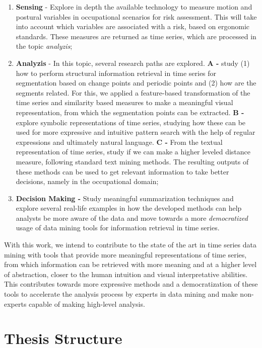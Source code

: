 \begin{enumerate}
\item \textbf{Sensing} - Explore in depth the available technology to measure motion and postural variables in occupational scenarios for risk assessment. This will take into account which variables are associated with a risk, based on ergonomic standards. These measures are returned as time series, which are processed in the topic \textit{analyzis};

\item \textbf{Analyzis} - In this topic, several research paths are explored. \textbf{A -} study (1) how to perform structural information retrieval in time series for segmentation based on change points and periodic points and (2) how are the segments related. For this, we applied a feature-based transformation of the time series and similarity based measures to make a meaningful visual representation, from which the segmentation points can be extracted. \textbf{B -} explore symbolic representations of time series, studying how these can be used for more expressive and intuitive pattern search with the help of regular expressions and ultimately natural language. \textbf{C -} From the textual representation of time series, study if we can make a higher leveled distance measure, following standard text mining methods. The resulting outputs of these methods can be used to get relevant information to take better decisions, namely in the occupational domain;

\item \textbf{Decision Making -} Study meaningful summarization techniques and explore several real-life examples in how the developed methods can help analysts be more aware of the data and move towards a more \textit{democratized} usage of data mining tools for information retrieval in time series. 

\end{enumerate}

With this work, we intend to contribute to the state of the art in time series data mining with tools that provide more meaningful representations of time series, from which information can be retrieved with more meaning and at a higher level of abstraction, closer to the human intuition and visual interpretative abilities. This contributes towards more expressive methods and a democratization of these tools to accelerate the analysis process by experts in data mining and make non-experts capable of making high-level analysis.


\section{Thesis Structure}
\label{sec:structure}

